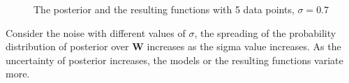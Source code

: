 \documentclass[12pt]{article}
\newenvironment{question}[2][Question]{\begin{trivlist}
\kern10pt
\item[\hskip \labelsep {\bfseries #1}\hskip \labelsep {\bfseries #2.}]}{\end{trivlist}}
\begin{document}
\begin{question}{9}
\begin{figure}[h!]
  \hfill
  \caption{The posterior and the resulting functions with 5 data points, $\sigma = 0.7$}
\end{figure}

Consider the noise with different values of $\sigma$, the spreading of the 
probability distribution of posterior over $\mathbf{W}$ increases as the sigma
value increases. As the uncertainty of posterior increases, the models or the 
resulting functions variate more.
\end{question}
\end{document}
